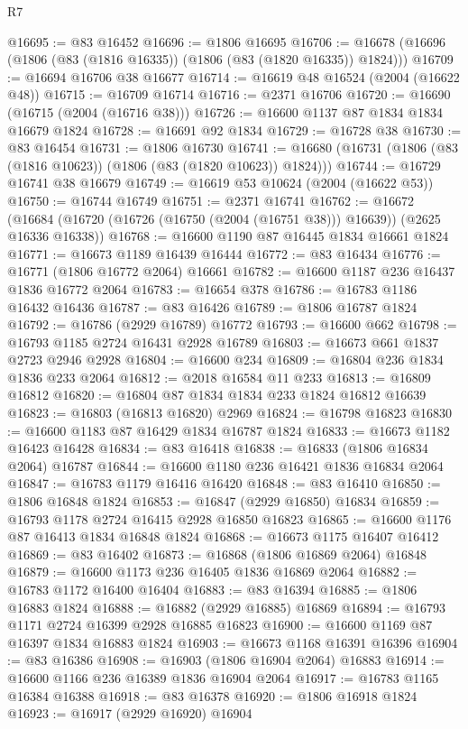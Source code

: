 \begin{lexlean}{R7}
\begin{coremodule}
@16695 := @83 @16452
@16696 := @1806 @16695
@16706 := @16678 (@16696 (@1806 (@83 (@1816 @16335)) (@1806 (@83 (@1820 @16335)) @1824)))
@16709 := @16694 @16706 @38 @16677
@16714 := @16619 @48 @16524 (@2004 (@16622 @48))
@16715 := @16709 @16714
@16716 := @2371 @16706
@16720 := @16690 (@16715 (@2004 (@16716 @38)))
@16726 := @16600 @1137 @87 @1834 @1834 @16679 @1824
@16728 := @16691 @92 @1834
@16729 := @16728 @38
@16730 := @83 @16454
@16731 := @1806 @16730
@16741 := @16680 (@16731 (@1806 (@83 (@1816 @10623)) (@1806 (@83 (@1820 @10623)) @1824)))
@16744 := @16729 @16741 @38 @16679
@16749 := @16619 @53 @10624 (@2004 (@16622 @53))
@16750 := @16744 @16749
@16751 := @2371 @16741
@16762 := @16672
    (@16684 (@16720 (@16726 (@16750 (@2004 (@16751 @38))) @16639)) (@2625 @16336 @16338))
@16768 := @16600 @1190 @87 @16445 @1834 @16661 @1824
@16771 := @16673 @1189 @16439 @16444
@16772 := @83 @16434
@16776 := @16771 (@1806 @16772 @2064) @16661
@16782 := @16600 @1187 @236 @16437 @1836 @16772 @2064
@16783 := @16654 @378
@16786 := @16783 @1186 @16432 @16436
@16787 := @83 @16426
@16789 := @1806 @16787 @1824
@16792 := @16786 (@2929 @16789) @16772
@16793 := @16600 @662
@16798 := @16793 @1185 @2724 @16431 @2928 @16789
@16803 := @16673 @661 @1837 @2723 @2946 @2928
@16804 := @16600 @234
@16809 := @16804 @236 @1834 @1836 @233 @2064
@16812 := @2018 @16584 @11 @233
@16813 := @16809 @16812
@16820 := @16804 @87 @1834 @1834 @233 @1824 @16812 @16639
@16823 := @16803 (@16813 @16820) @2969
@16824 := @16798 @16823
@16830 := @16600 @1183 @87 @16429 @1834 @16787 @1824
@16833 := @16673 @1182 @16423 @16428
@16834 := @83 @16418
@16838 := @16833 (@1806 @16834 @2064) @16787
@16844 := @16600 @1180 @236 @16421 @1836 @16834 @2064
@16847 := @16783 @1179 @16416 @16420
@16848 := @83 @16410
@16850 := @1806 @16848 @1824
@16853 := @16847 (@2929 @16850) @16834
@16859 := @16793 @1178 @2724 @16415 @2928 @16850 @16823
@16865 := @16600 @1176 @87 @16413 @1834 @16848 @1824
@16868 := @16673 @1175 @16407 @16412
@16869 := @83 @16402
@16873 := @16868 (@1806 @16869 @2064) @16848
@16879 := @16600 @1173 @236 @16405 @1836 @16869 @2064
@16882 := @16783 @1172 @16400 @16404
@16883 := @83 @16394
@16885 := @1806 @16883 @1824
@16888 := @16882 (@2929 @16885) @16869
@16894 := @16793 @1171 @2724 @16399 @2928 @16885 @16823
@16900 := @16600 @1169 @87 @16397 @1834 @16883 @1824
@16903 := @16673 @1168 @16391 @16396
@16904 := @83 @16386
@16908 := @16903 (@1806 @16904 @2064) @16883
@16914 := @16600 @1166 @236 @16389 @1836 @16904 @2064
@16917 := @16783 @1165 @16384 @16388
@16918 := @83 @16378
@16920 := @1806 @16918 @1824
@16923 := @16917 (@2929 @16920) @16904

\end{coremodule}
\end{lexlean}
